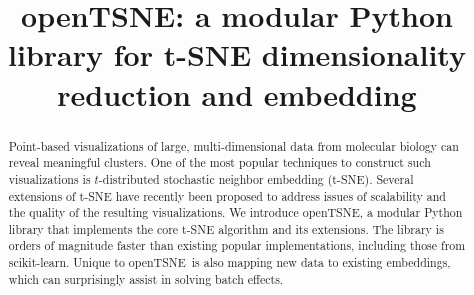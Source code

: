 \documentclass[twocolumn]{bmcart}
\newcommand{\opentsne}{\textsf{openTSNE}}
\begin{document}
\begin{frontmatter}

\begin{fmbox}

\title{openTSNE: a modular Python library for t-SNE dimensionality reduction and embedding}

\author[
   addressref={aff1},                   %
   corref={aff1},                       %
   email={pavlin.policar@fri.uni-lj.si}   %
]{ }
\author[
   addressref={aff1,aff2}
]{ }
\author[
   addressref={aff1,aff3}
]{ }

\address[id=aff1]{%
  ,
  ,
}
\address[id=aff2]{%
  ,
  ,
}
\address[id=aff3]{%
  ,
  ,
}

\end{fmbox}%

\begin{abstractbox}
\begin{abstract}
Point-based visualizations of large, multi-dimensional data from molecular
biology can reveal meaningful clusters. One of the most popular
techniques to construct such visualizations is $t$-distributed stochastic
neighbor embedding (t-SNE). Several extensions of t-SNE have
recently been proposed to address issues of scalability and the quality
of the resulting visualizations. We introduce \opentsne, a modular
Python library that implements the core t-SNE algorithm and its
extensions. The library is orders of magnitude faster than existing
popular implementations, including those from scikit-learn. Unique to
\opentsne\ is also mapping new data to existing embeddings,
which can surprisingly assist in solving batch effects.
\end{abstract}

\begin{keyword}
\end{keyword}


\end{abstractbox}
%

\end{frontmatter}
\end{document}
